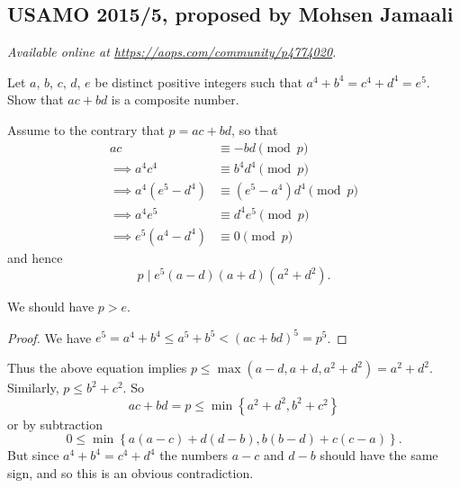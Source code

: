 \documentclass[11pt]{scrartcl}
\begin{document}
\subsection{USAMO 2015/5, proposed by Mohsen Jamaali}
\textsl{Available online at \url{https://aops.com/community/p4774020}.}
\begin{mdframed}[style=mdpurplebox,frametitle={Problem statement}]
Let $a$, $b$, $c$, $d$, $e$ be distinct positive integers
such that $a^4+b^4=c^4+d^4=e^5$.
Show that $ac+bd$ is a composite number.
\end{mdframed}
Assume to the contrary that $p = ac+bd$, so that
\begin{align*}
  ac &\equiv -bd \pmod p \\
  \implies a^4c^4 &\equiv b^4d^4 \pmod p \\
  \implies a^4 (e^5 - d^4) &\equiv (e^5 - a^4) d^4 \pmod p \\
  \implies a^4 e^5 &\equiv d^4 e^5 \pmod p \\
  \implies e^5(a^4-d^4) &\equiv 0 \pmod p
\end{align*}
and hence \[ p \mid e^5(a-d)(a+d)(a^2+d^2). \]

\begin{claim*}
  We should have $p > e$.
\end{claim*}
\begin{proof}
  We have $e^5 = a^4 + b^4 \le a^5 + b^5 < (ac+bd)^5 = p^5$.
\end{proof}
Thus the above equation implies $p \le \max(a-d, a+d, a^2+d^2) = a^2+d^2$.
Similarly, $p \le b^2+c^2$.
So \[ ac+bd = p \le \min \left\{ a^2+d^2, b^2+c^2 \right\} \]
or by subtraction
\[ 0 \le \min \left\{ a(a-c) + d(d-b),
  b(b-d) + c(c-a) \right\}. \]
But since $a^4+b^4 = c^4+d^4$ the numbers $a-c$ and $d-b$
should have the same sign, and so this is an obvious contradiction.
\pagebreak
\end{document}
